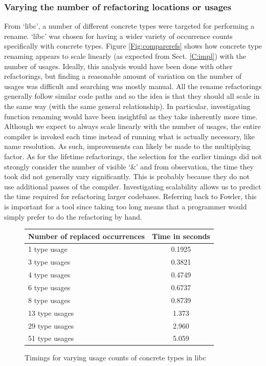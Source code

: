 \subsubsection{Varying the number of refactoring locations or usages}
From `libc', a number of different concrete types were targeted for performing a rename. `libc' was chosen for having a wider variety of occurrence counts specifically with concrete types. Figure \ref{Fig:comparerefs} shows how concrete type renaming appears to scale linearly (as expected from Sect. \ref{C:impl}) with the number of usages. Ideally, this analysis would have been done with other refactorings, but finding a reasonable amount of variation on the number of usages was difficult and searching was mostly manual. All the rename refactorings generally follow similar code paths and so the idea is that they should all scale in the same way (with the same general relationship). In particular, investigating function renaming would have been insightful as they take inherently more time. Although we expect to always scale linearly with the number of usages, the entire compiler is invoked each time instead of running what is actually necessary, like name resolution. As such, improvements can likely be made to the multiplying factor. As for the lifetime refactorings, the selection for the earlier timings did not strongly consider the number of visible `\&' and from observation, the time they took did not generally vary significantly. This is probably because they do not use additional passes of the compiler. Investigating scalability allows us to predict the time required for refactoring larger codebases. Referring back to Fowler, this is important for a tool since taking too long means that a programmer would simply prefer to do the refactoring by hand.

\begin{figure}[h]
\begin{center}
    \begin{tabular}{ | l | c |}
    \hline
    \textbf{Number of replaced occurrences} & \textbf{Time in seconds} \\ \hline
    1 type usage &  0.1925  \\ \hline
    3 type usages &  0.3821  \\ \hline
    4 type usages &   0.4749  \\ \hline
    6 type usages &   0.6737  \\ \hline
    8 type usages &   0.8739 \\ \hline
    13 type usages  &  1.373 \\ \hline
    29 type usages &  2.960  \\ \hline
    51 type usages &  5.059 \\ \hline
    \end{tabular}
\end{center}

\caption{Timings for varying usage counts of concrete types in libc}
\label{Fig:scaling}
\end{figure}

